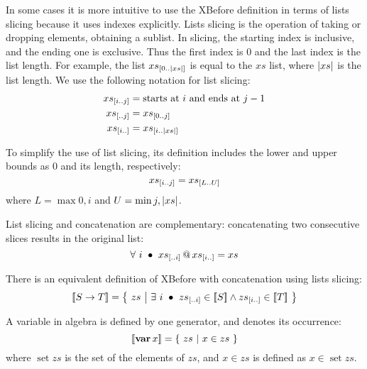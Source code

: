 In some cases it is more intuitive to use the \ac{XBefore} definition in terms of lists slicing because it uses indexes explicitly.
Lists slicing is the operation of taking or dropping elements, obtaining a sublist.
In slicing, the starting index is inclusive, and the ending one is exclusive.
Thus the first index is 0 and the last index is the list length.
For example, the list $xs_{\left[0..\left|xs\right|\right]}$ is equal to the $xs$ list, where $\left|xs\right|$ is the list length.
We use the following notation for list slicing:
%
\begin{subequations}
\begin{align}
xs_{\left[i..j\right]} &= \text{starts at $i$ and ends at $j-1$}\label{def:slice}\\
xs_{\left[..j\right]} &= xs_{\left[0..j\right]}\label{def:slice-right}\\
xs_{\left[i..\right]} &= xs_{\left[i..\left|xs\right|\right]}\label{def:slice-left}
\end{align}
\end{subequations}

To simplify the use of list slicing, its definition includes the lower and upper bounds as $0$ and its length, respectively:
%
\begin{equation}
xs_{\left[i..j\right]} = xs_{\left[L..U\right]}
\end{equation}
%
where $L = \max{0,i}$ and $U = \min{j,\ensuremath\left|xs\right|}$.

List slicing and concatenation are complementary: concatenating two consecutive slices results in the original list:
\begin{equation}
\label{law:slice-append}
\forall~ i ~\bullet~ xs_{\left[..i\right]} \operatorname{\mathbf{@}} xs_{\left[i..\right]} = xs
\end{equation}

There is an equivalent definition of \ac{XBefore} with concatenation using lists slicing:
%
\begin{equation}
\label{def:xbefore-slice}
\left[\!\left[S \rightarrow T\right]\!\right] =
  \left\{~
    zs ~\middle|~ \exists~ i ~\bullet~ zs_{\left[..i\right]} \in \left[\!\left[S\right]\!\right] \land zs_{\left[i..\right]} \in \left[\!\left[T\right]\!\right]
  ~\right\}
\end{equation}

A variable in \ac{algebra} is defined by one generator, and denotes its occurrence:
%
\begin{equation}
\label{def:var}
\left[\!\left[\operatorname{\mathbf{var}} x\right]\!\right] =
  \left\{~
    zs ~\middle|~ x \in zs
  ~\right\}
\end{equation}
%
where $\mathop{set}zs$ is the set of the elements of $zs$, and $x \in zs$ is defined as $x \in \mathop{set} zs$.

